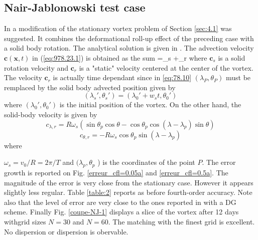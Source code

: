 \subsection{Nair-Jablonowski test case}
\label{sec:4.2}
In \cite{Nair-Jablonowski} a modification of the stationary vortex problem of
Section \ref{sec:4.1} was suggested. It combines 
the deformational roll-up effect of the 
preceding case
with a solid body rotation.
The analytical solution is given in \cite{Nair-Jablonowski}.
The advection velocity $\mathbf{c}(\mathbf{x},t)$ in (\ref{eq:978.23.1}) is
obtained as the sum
\beq
{}=_s +_r
\eeq
where $\mathbf{c}_s$ is a solid rotation velocity and 
$\mathbf{c}_r$ is a "static" velocity centered at the center 
of the vortex. The velocity $\mathbf{c}_r$ is actually time dependant 
since in \eqref{eq:78.10}
$(\lambda_P, \theta_P)$ must be remplaced by the solid body advected 
position given  by 
\begin{equation}
(\lambda_s', \theta_s') = (\lambda_0' + w_s t, \theta_0')
\end{equation}
where $(\lambda_0', \theta_0')$ is the initial position of the vortex.
On the other hand, the solid-body velocity is given by
\begin{equation}
c_{\lambda, r} = R \omega_s \left( \sin \theta_p \cos \theta - \cos \theta_p \cos ( \lambda - \lambda_p ) \sin \theta \right)
\label{vitesse_lambda_bump}
\end{equation}
\begin{equation}
c_{\theta, r} = - R \omega_s \cos \theta_p \sin ( \lambda - \lambda_p )
\label{vitesse_theta_bump}
\end{equation}
where

$\omega_s = v_0 / R = 2 \pi / T $ and $( \lambda_p, \theta_p$ )  
is the coordinates of the point $P$.
The error growth is reported on Fig. \ref{erreur_cfl=0.05a}
and \ref{erreur_cfl=0.5a}. The magnitude of the error
is very close from the stationary case. However it appears 
slightly less regular. Table \ref{table:2} reports
as before fourth-order accuracy. Note also that the level
of error are very close to the ones reported in
\cite{Nair-Jablonowski} with a DG scheme. Finally
Fig. \ref{coupe-NJ-1} displays a slice of the vortex after 12 days
withgrid sizes $N=30$ and $N=60$. 
The matching with the finest grid
is excellent. No dispersion or dispersion is obervable.


